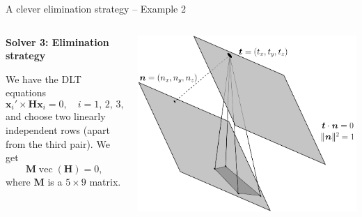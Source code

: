 \documentclass[aspectratio=169]{beamer}
\newcommand{\mat}[1]{\bm{#1}}
\DeclareMathOperator{\vectorize}{vec}
\begin{document}
\begin{frame}[t]{A clever elimination strategy -- Example 2}
\begin{columns}
    \begin{column}{0.5\textwidth}
        \begin{minipage}[t][\textheight][t]{\textwidth}
        \theimportanceTwoHeight
        \textbf{Solver 3: Elimination strategy}

        We have the DLT equations
        \begin{equation*}
            \mat{x}_i'\times \mat{Hx}_i = 0, \quad i=1,\,2,\,3,
        \end{equation*}
        and choose two linearly independent rows (apart from the third pair). We get
        \begin{equation*}
            \mat{M}\vectorize(\mat{H}) = 0,
        \end{equation*}
        where $\mat{M}$ is a $5\times 9$ matrix.
        \end{minipage}
    \end{column}%
    \begin{column}{0.5\textwidth}
        \centering
        \includegraphics[width=\linewidth]{../lecture_notes/images/prob_geom1b.pdf}
    \end{column}
\end{columns}
\end{frame}
\end{document}

